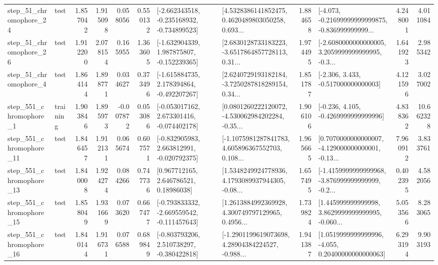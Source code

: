\begin{tabular}{llrrrrllrlrr}
   step\_51\_chromophore\_24 &      test &      1.857042 &    1.915098 &      0.058056 &  0.550132 &  [-2.662343518, -0.235168932, -0.734899523] &  [4.5328386141852475, 0.4620489803050258, 0.693... &       1.884658 &  [-4.073, -0.21699999999999875, -0.836999999999... &            4.248001 &          4.011084 \\
   step\_51\_chromophore\_26 &      test &      1.912200 &    2.078154 &      0.165955 &  1.363605 &   [-1.632904339, 1.987875807, -0.152239365] &  [2.6830128733183223, -3.6517864857728113, 0.31... &       1.974495 &  [-2.6080000000000005, 3.2059999999999995, -0.3... &            1.641923 &          2.985342 \\
    step\_51\_chromophore\_4 &      test &      1.864144 &    1.898771 &      0.034627 &  0.373496 &   [-1.615884735, 2.178394864, -0.492207267] &  [2.6240729193182184, -3.7250287818289154, 0.34... &       1.851787 &                [-2.306, 3.433, -0.517000000000003] &            4.121596 &          3.027002 \\
   step\_551\_chromophore\_1 &  training &      1.903846 &    1.895973 &     -0.007872 &  0.053086 &   [-0.053017162, 2.673301416, -0.074402178] &  [0.0801260222120072, -4.530062984202284, -0.35... &       1.906106 &               [-0.236, 4.105, -0.4269999999999996] &            4.838362 &         10.662328 \\
  step\_551\_chromophore\_11 &      test &      1.846457 &    1.912131 &      0.065674 &  0.607571 &   [-0.832905983, 2.663812991, -0.020792375] &  [-1.1075981287841783, 4.605896367552703, 0.108... &       1.965665 &  [0.7070000000000007, -4.129000000000001, -0.13... &            7.960912 &          3.833761 \\
  step\_551\_chromophore\_13 &      test &      1.840008 &    1.924274 &      0.084266 &  0.747736 &      [0.967712165, 2.646786521, 0.18986038] &  [1.5348249924778936, 4.1793089937944305, -0.08... &       1.657495 &  [-1.4159999999999968, -3.876999999999999, -0.2... &            0.402395 &          4.582056 \\
  step\_551\_chromophore\_15 &      test &      1.858049 &    1.931669 &      0.073620 &  0.667477 &  [-0.793833332, -2.669559542, -0.111457643] &  [1.2613884992369928, 4.300749797129965, 0.4956... &       1.739824 &  [1.445999999999998, 3.8629999999999995, -0.060... &            5.053566 &          8.283065 \\
  step\_551\_chromophore\_16 &      test &      1.840144 &    1.916731 &      0.076588 &  0.689849 &   [-0.803793206, 2.510738297, -0.380422818] &  [-1.2901199619073698, 4.28904384224527, -0.988... &       1.941387 &  [1.0519999999999996, -4.055, 0.20400000000000063] &            6.293194 &          9.903193 \\

\end{tabular}
